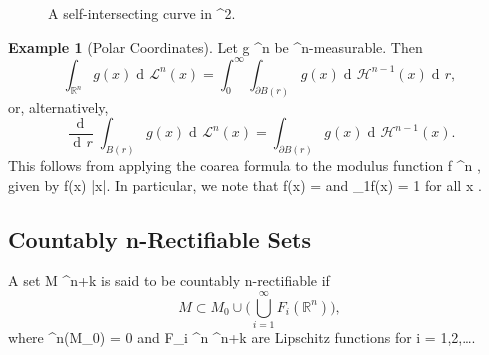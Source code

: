 \documentclass[a4paper, 11pt]{article}
\theoremstyle{plain}
\theoremstyle{definition}
\newtheorem{example}[theorem]{Example}
\theoremstyle{remark}
\DeclareMathOperator{\diff}{d \!}
\numberwithin{equation}{subsection}
\def\({}
\def\){}
\begin{document}
\begin{figure}
\begin{center}
\end{center}
\vspace{-5ex}
\caption{A self-intersecting curve in \(^{2}\).}
\label{Fig: self-intersecting curve}
\end{figure}


\begin{example}[Polar Coordinates]
\label{Polar_Coordinates}
Let \(g \vcentcolon {}^{n} \rightarrow {}\) be \(^{n}\)-measurable. Then
\begin{equation}
\int_{\mathbb{R}^{n}}g(x)\diff \mathcal{L}^{n}(x) = \int_{0}^{\infty}\int_{\partial B(r)}g(x)\diff\mathcal{H}^{n-1}(x)\diff r,
\end{equation}
or, alternatively,
\begin{equation}
\frac{\!\diff}{\diff r}\int_{B(r)}g(x)\diff \mathcal{L}^{n}(x) = \int_{\partial B(r)}g(x)\diff\mathcal{H}^{n-1}(x).
\end{equation}
This follows from applying the coarea formula to the modulus function \(f \vcentcolon {}^{n} \rightarrow {}\), given by \(f(x) \coloneq |x|\). In particular, we note that \(\nabla f(x) = \) and \(_{1}f(x) = 1\) for all \(x \).
\end{example}

\subsection{Countably \(n\)-Rectifiable Sets}

A set \(M \subset {}^{n+k}\) is said to be countably \(n\)-rectifiable if
\begin{equation}
M \subset M_0 \cup \bigg(\bigcup_{i=1}^{\infty}F_i(\mathbb{R}^n)\bigg),
\end{equation}
where \(^{n}(M_0) = 0\) and \(F_i \vcentcolon {}^{n} \rightarrow {}^{n+k}\) are Lipschitz functions for \(i = 1,2,\ldots\).
\end{document}
